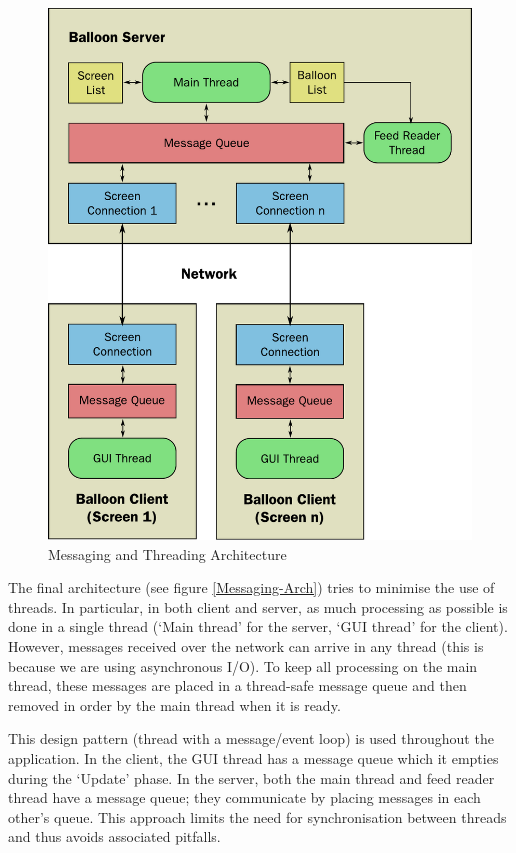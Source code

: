 \begin{figure}
\begin{centering}
\includegraphics[scale=0.95]{Diagrams/messaging}
\par\end{centering}

\caption{Messaging and Threading Architecture}
\label{Messaging-Arch}
\end{figure}

The final architecture (see figure \vref{Messaging-Arch}) tries to minimise the
use of threads. In particular, in both client and server, as much processing as
possible is done in a single thread (`Main thread' for the server, `GUI thread'
for the client). However, messages received over the network
can arrive in any thread (this is because we are using asynchronous I/O). To 
keep all processing on the main thread, these messages are placed in a thread-safe
message queue and then removed in order by the main thread when it is ready. 

This design pattern (thread with a message/event loop) is used throughout the
application. In the client, the GUI thread has a message queue which it empties
during the `Update' phase. In the server, both the main thread and feed reader 
thread have a message queue; they communicate by placing messages in each other's
queue. This approach limits the need for synchronisation between threads and 
thus avoids associated pitfalls.

